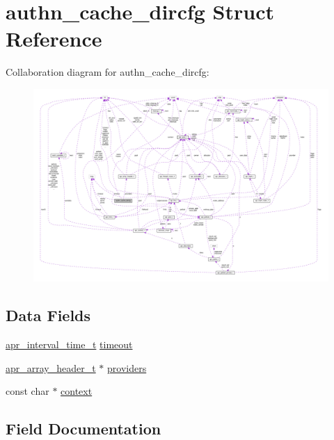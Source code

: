 \hypertarget{structauthn__cache__dircfg}{}\section{authn\+\_\+cache\+\_\+dircfg Struct Reference}
\label{structauthn__cache__dircfg}


Collaboration diagram for authn\+\_\+cache\+\_\+dircfg\+:
\nopagebreak
\begin{figure}[H]
\begin{center}
\leavevmode
\includegraphics[width=350pt]{structauthn__cache__dircfg__coll__graph}
\end{center}
\end{figure}
\subsection*{Data Fields}
\begin{DoxyCompactItemize}
\item 
\hyperlink{group__apr__time_gaae2129185a395cc393f76fabf4f43e47}{apr\+\_\+interval\+\_\+time\+\_\+t} \hyperlink{structauthn__cache__dircfg_a4354c3df3fd659e5aef8a84b9752de92}{timeout}
\item 
\hyperlink{structapr__array__header__t}{apr\+\_\+array\+\_\+header\+\_\+t} $\ast$ \hyperlink{structauthn__cache__dircfg_a6e135f353391d4456b8ede7d3e31c47e}{providers}
\item 
const char $\ast$ \hyperlink{structauthn__cache__dircfg_a5c92c0961f794bf12659b9f183beeaa7}{context}
\end{DoxyCompactItemize}


\subsection{Field Documentation}
